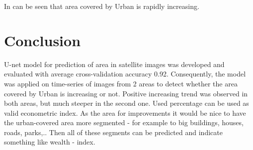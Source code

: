 \documentclass{homework}
\begin{document}
In can be seen that area covered by Urban is rapidly increasing.


\section{Conclusion}
U-net model for prediction of area in satellite images was developed and evaluated with average cross-validation accuracy 0.92. Consequently, the model was applied on time-series of images from 2 areas to detect whether the area covered by Urban is increasing or not. Positive increasing trend was observed in both areas, but much steeper in the second one. Used percentage can be used as valid econometric index. As the area for improvements it would be nice to have the urban-covered area more segmented - for example to big buildings, houses, roads, parks,.. Then all of these segments can be predicted and indicate something like wealth - index.
\end{document}
